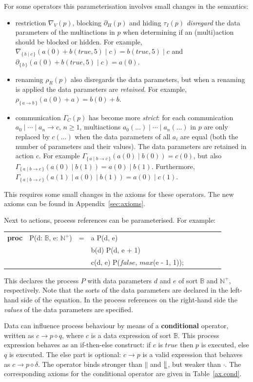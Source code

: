 \documentclass[a4paper,fleqn]{article}
\makeatletter
\newcommand{\f}[1]{\ensuremath{\mathit{#1}}}
\newcommand{\set}[1]{\ensuremath{\{\,#1\,\}}}
\newcommand{\bool}{\ensuremath{\mathbb{B}}}
\newcommand{\true}{\ensuremath{\f{true}}}
\newcommand{\false}{\ensuremath{\f{false}}}
\newcommand{\nat}{\ensuremath{\mathbb{N}}}
\newcommand{\pos}{\ensuremath{\nat^{+}}}
\newcommand{\deffont}[1]{\textbf{#1}}
\newcommand{\seq}{\mathbin{\cdot}}
\newcommand{\alt}{\mathbin{+}}
\newcommand{\pmerge}{\mathbin{\parallel}}
\newcommand{\lmerge}{\mathbin{\llfloor}}
\newcommand{\sync}{\mathbin{\!\mid\!}}
\newcommand{\block}[1]{\partial_{#1}}
\newcommand{\hide}[1]{\tau_{#1}}
\newcommand{\ren}[1]{\rho_{#1}}
\newcommand{\allow}[1]{\nabla_{#1}}
\newcommand{\comm}[1]{\Gamma_{#1}}
\newenvironment{mcrl2}%
{\par\bigskip\noindent%
 \begin{tabular}{@{}>{\bf}p{2.3em}L@{\ }L@{\ }L@{\ }L@{\ }L@{\ }L@{\ }L@{\ }L}%
}%
{\end{tabular}\bigskip\par%
}
\makeatother
\begin{document}
For some operators this parameterisation involves small changes in the
semantics:
\begin{itemize}
\item restriction $\allow{V}(p)$, blocking $\block{H}(p)$ and hiding
$\hide{I}(p)$
\emph{disregard} the data parameters of the multiactions in $p$ when
determining if an (multi)action should be blocked or hidden. For example, 
$\allow{\set{b \mid c}}(a(0) \alt b(\true,5) \sync c) = b(\true,5) \sync c$ and
$\block{\set{b}}(a(0) \alt b(\true,5) \sync c) = a(0)$.
\item renaming $\ren{R}(p)$ also disregards the data parameters, but when a
renaming is applied the data parameters are \emph{retained}. For example,
$\ren{\set{a \to b}}(a(0) \alt a) = b(0) \alt b$.
\item communication $\comm{C}(p)$ has become more \emph{strict}: for each
communication $a_0 \sync \cdots \sync a_n \to c$, $n \geq 1$, multiactions
$a_0(\ldots) \sync \cdots \sync a_n(\ldots)$ in $p$ are only replaced by
$c(\ldots)$ when the data parameters of all $a_i$ are equal (both the number
of parameters and their values). The data parameters are retained in action
$c$. For example $\comm{\set{a \mid b \to c}}(a(0) \sync b(0)) = c(0)$, but
also $\comm{\set{a \mid b \to c}}(a(0) \sync b(1)) = a(0) \sync b(1)$.
Furthermore, $\comm{\set{a \mid b \to c}}(a(1) \sync a(0) \sync b(1)) = a(0)
\sync c(1)$.
\end{itemize}

\noindent
This requires some small changes in the axioms for these operators. The new
axioms can be found in Appendix~\ref{sec:axioms}.

Next to actions, process references can be parameterised. For example:
\begin{mcrl2}
proc & P(d: \bool, e: \pos)
  & =    & a \seq P(d, e)\\
& & \alt & b(d) \seq P(\lnot d, e + 1)\\
& & \alt & c(d, e) \seq P(\false, \f{max}(e - 1, 1));\\
\end{mcrl2}
\noindent This declares the process $P$ with data parameters $d$ and $e$ of
sort $\bool$ and $\pos$, respectively. Note that the sorts of the data
parameters are declared in the left-hand side of the equation. In
the process references on the right-hand side the \emph{values} of the data
parameters are specified.

Data can influence process behaviour by means of a \deffont{conditional}
operator, written as $c \to p \diamond q$, where $c$ is a data expression of sort
$\bool$. This process expression behaves as an if-then-else construct: if $c$
is $\true$ then $p$ is executed, else $q$ is executed. The else part is
optional: $c \to p$ is a valid expression that behaves as $c \to p \diamond \delta$.
The operator binds stronger than $\pmerge$ and $\lmerge$, but weaker than
$\seq$. The corresponding axioms for the conditional operator are given in
Table~\ref{ax.cond}.
\end{document}

